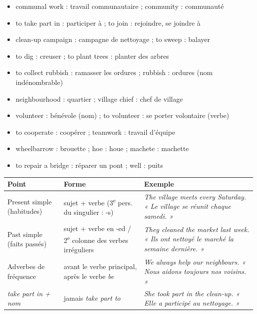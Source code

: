 \documentclass[11pt]{article}
\newcommand{\cle}[1]{{\popxbold\color{popdark}#1}}
\newcommand{\eng}[1]{\ifmmode\text{\textit{#1}}\else\begingroup\selectlanguage{english}\itshape #1\endgroup\fi}
\begin{document}
\begin{aretenir}
\begin{itemize}
\item \cle{communal work} : travail communautaire ; \cle{community} : communauté
\item \cle{to take part in} : participer à ; \cle{to join} : rejoindre, se joindre à
\item \cle{clean-up campaign} : campagne de nettoyage ; \cle{to sweep} : balayer
\item \cle{to dig} : creuser ; \cle{to plant trees} : planter des arbres
\item \cle{to collect rubbish} : ramasser les ordures ; \cle{rubbish} : ordures (nom indénombrable)
\item \cle{neighbourhood} : quartier ; \cle{village chief} : chef de village
\item \cle{volunteer} : bénévole (nom) ; \cle{to volunteer} : se porter volontaire (verbe)
\item \cle{to cooperate} : coopérer ; \cle{teamwork} : travail d'équipe
\item \cle{wheelbarrow} : brouette ; \cle{hoe} : houe ; \cle{machete} : machette
\item \cle{to repair a bridge} : réparer un pont ; \cle{well} : puits
\end{itemize}
\end{aretenir}

\begin{propriete}
\begin{center}
\begin{tabularx}{\linewidth}{|X|X|X|}
\hline
\rowcolor{popblueL} Point & Forme & Exemple \\
\hline
Present simple (habitudes) & sujet + verbe (3\textsuperscript{e} pers. du singulier : -s) & \eng{The village meets every Saturday.} « Le village se réunit chaque samedi. » \\
\hline
Past simple (faits passés) & sujet + verbe en -ed / 2\textsuperscript{e} colonne des verbes irréguliers & \eng{They cleaned the market last week.} « Ils ont nettoyé le marché la semaine dernière. » \\
\hline
Adverbes de fréquence & avant le verbe principal, après le verbe \eng{be} & \eng{We always help our neighbours.} « Nous aidons toujours nos voisins. » \\
\hline
\eng{take part in} + nom & jamais \eng{take part to} & \eng{She took part in the clean-up.} « Elle a participé au nettoyage. » \\
\hline
\end{tabularx}
\end{center}
\end{propriete}
\end{document}
